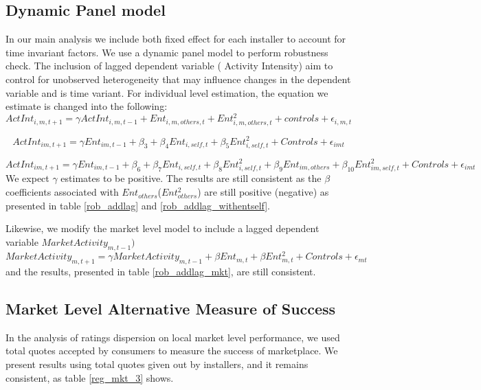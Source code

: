 \documentclass[msom,blindrev]{informs3}
\begin{document}
\subsection{Dynamic Panel model}
In our main analysis we include both fixed effect for each installer to account for time invariant factors. We use a dynamic panel model to perform robustness check. The inclusion of lagged dependent variable ( Activity Intensity) aim to control for unobserved heterogeneity that may influence changes in the dependent variable and is time variant. For individual level estimation, the equation we estimate is changed into the following:
\begin{equation}
    ActInt_{i,m,t+1}=\gamma ActInt_{i,m,t-1}+Ent_{i,m,others,t}+Ent_{i,m,others,t}^2+
    controls+\epsilon_{i,m,t}
\end{equation}

\begin{equation}
    ActInt_{im,t+1}=\gamma Ent_{im,t-1}+\beta_{3}+\beta_{4} Ent_{i,self,t}+\beta_{5}Ent_{i,self,t}^2+
   Controls+\epsilon_{imt}
   \label{model_ind_dyn_1}
\end{equation}

\begin{equation}
    ActInt_{im,t+1}=\gamma Ent_{im,t-1}+\beta_{6}+\beta_{7} Ent_{i,self,t}+\beta_{8}Ent_{i,self,t}^2+\beta_{9}Ent_{im,others}+\beta_{10}Ent_{im,self,t}^2+
   Controls+\epsilon_{imt}
   \label{model_ind_dyn_2}
\end{equation}
We expect $\gamma$ estimates to be positive. The results are still consistent as the $\beta$ coefficients associated with $Ent_{others}$($Ent_{others}^2$) are still positive (negative) as presented in table \ref{rob_addlag} and \ref{rob_addlag_withentself}.

Likewise, we modify the market level model to include a lagged dependent variable $MarketActivity_{m,t-1})$
\begin{equation}
    MarketActivity_{m,t+1}=\gamma MarketActivity_{m,t-1}+\beta Ent_{m,t}+\beta Ent_{m,t}^2+Controls+\epsilon_{mt}
\end{equation}
and the results, presented in table \ref{rob_addlag_mkt}, are still consistent.




\subsection{Market Level Alternative Measure of Success}

In the analysis of ratings dispersion on local market level performance, we used total quotes accepted by consumers to measure the success of marketplace. We present results using total quotes given out by installers, and it remains consistent, as table \ref{reg_mkt_3} shows.
\end{document}
